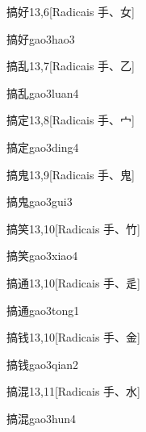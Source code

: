 \begin{entry}{搞好}{13,6}[Radicais ⼿、⼥]
  \begin{phonetics}{搞好}{gao3hao3}
  \end{phonetics}
\end{entry}

\begin{entry}{搞乱}{13,7}[Radicais ⼿、⼄]
  \begin{phonetics}{搞乱}{gao3luan4}
  \end{phonetics}
\end{entry}

\begin{entry}{搞定}{13,8}[Radicais ⼿、⼧]
  \begin{phonetics}{搞定}{gao3ding4}
  \end{phonetics}
\end{entry}

\begin{entry}{搞鬼}{13,9}[Radicais ⼿、⿁]
  \begin{phonetics}{搞鬼}{gao3gui3}
  \end{phonetics}
\end{entry}

\begin{entry}{搞笑}{13,10}[Radicais ⼿、⽵]
  \begin{phonetics}{搞笑}{gao3xiao4}
  \end{phonetics}
\end{entry}

\begin{entry}{搞通}{13,10}[Radicais ⼿、⾡]
  \begin{phonetics}{搞通}{gao3tong1}
  \end{phonetics}
\end{entry}

\begin{entry}{搞钱}{13,10}[Radicais ⼿、⾦]
  \begin{phonetics}{搞钱}{gao3qian2}
  \end{phonetics}
\end{entry}

\begin{entry}{搞混}{13,11}[Radicais ⼿、⽔]
  \begin{phonetics}{搞混}{gao3hun4}
  \end{phonetics}
\end{entry}

